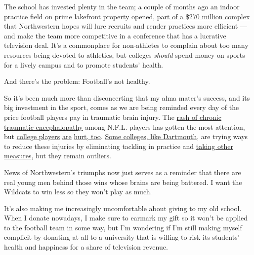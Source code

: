 The school has invested plenty in the team; a couple of months ago an
indoor practice field on prime lakefront property opened,
\href{https://www.chicagotribune.com/sports/college/ct-spt-northwestern-athletics-facility-football-20180802-story.html}{part
of a \$270 million complex} that Northwestern hopes will lure recruits
and render practices more efficient --- and make the team more
competitive in a conference that has a lucrative television deal. It's a
commonplace for non-athletes to complain about too many resources being
devoted to athletics, but colleges \emph{should} spend money on sports
for a lively campus and to promote students' health.

And there's the problem: Football's not healthy.

So it's been much more than disconcerting that my alma mater's success,
and its big investment in the sport, comes as we are being reminded
every day of the price football players pay in traumatic brain injury.
The
\href{https://www.nytimes3xbfgragh.onion/interactive/2017/07/25/sports/football/nfl-cte.html}{rash
of chronic traumatic encephalopathy} among N.F.L. players has gotten the
most attention, but
\href{https://www.nytimes3xbfgragh.onion/2010/09/14/sports/14football.html}{college
players}
\href{https://concussionfoundation.org/CTE-resources/cte-college-football}{are}
\href{https://www.today.com/health/college-football-player-tyler-hilinski-who-died-suicide-had-cte-t131843}{hurt,
too}.
\href{https://www.nytimes3xbfgragh.onion/2018/10/26/sports/ivy-league-football-dartmouth.html?action=click\&module=RelatedCoverage\&pgtype=Article\&region=Footer}{Some
colleges, like Dartmouth}, are trying ways to reduce these injuries by
eliminating tackling in practice and
\href{http://www.espn.com/college-football/story/_/id/24859819/concussions-drop-ivy-league-football-kickoff-change}{taking
other measures}, but they remain outliers.

News of Northwestern's triumphs now just serves as a reminder that there
are real young men behind those wins whose brains are being battered. I
want the Wildcats to win less so they won't play as much.

It's also making me increasingly uncomfortable about giving to my old
school. When I donate nowadays, I make sure to earmark my gift so it
won't be applied to the football team in some way, but I'm wondering if
I'm still making myself complicit by donating at all to a university
that is willing to risk its students' health and happiness for a share
of television revenue.

